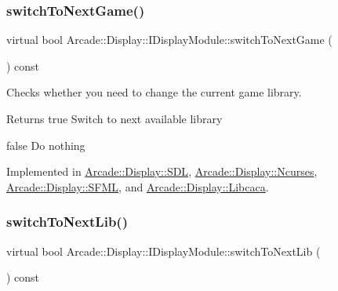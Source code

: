 \mbox{\label{classArcade_1_1Display_1_1IDisplayModule_a9584cb0ca3b157c9a4ec94509e4f8e32}} 
\subsubsection{\texorpdfstring{switchToNextGame()}{switchToNextGame()}}
{\footnotesize\ttfamily virtual bool Arcade\+::\+Display\+::\+I\+Display\+Module\+::switch\+To\+Next\+Game (\begin{DoxyParamCaption}{ }\end{DoxyParamCaption}) const\hspace{0.3cm}{\ttfamily [pure virtual]}}



Checks whether you need to change the current game library. 

\begin{DoxyReturn}{Returns}
true Switch to next available library 

false Do nothing 
\end{DoxyReturn}


Implemented in \mbox{\hyperlink{classArcade_1_1Display_1_1SDL_a3f197b6ea176410b4eb472d7e848eb10}{Arcade\+::\+Display\+::\+S\+DL}}, \mbox{\hyperlink{classArcade_1_1Display_1_1Ncurses_a915b07b0cc03a96303c0d01b59652996}{Arcade\+::\+Display\+::\+Ncurses}}, \mbox{\hyperlink{classArcade_1_1Display_1_1SFML_af47adddb8c2f26b5ee0109abce03e27a}{Arcade\+::\+Display\+::\+S\+F\+ML}}, and \mbox{\hyperlink{classArcade_1_1Display_1_1Libcaca_ab9f5be320196e902e43db50e0cdcce5e}{Arcade\+::\+Display\+::\+Libcaca}}.

\mbox{\label{classArcade_1_1Display_1_1IDisplayModule_a0de47361c9d47bf8fc52070b945f23b7}} 
\subsubsection{\texorpdfstring{switchToNextLib()}{switchToNextLib()}}
{\footnotesize\ttfamily virtual bool Arcade\+::\+Display\+::\+I\+Display\+Module\+::switch\+To\+Next\+Lib (\begin{DoxyParamCaption}{ }\end{DoxyParamCaption}) const\hspace{0.3cm}{\ttfamily [pure virtual]}}



